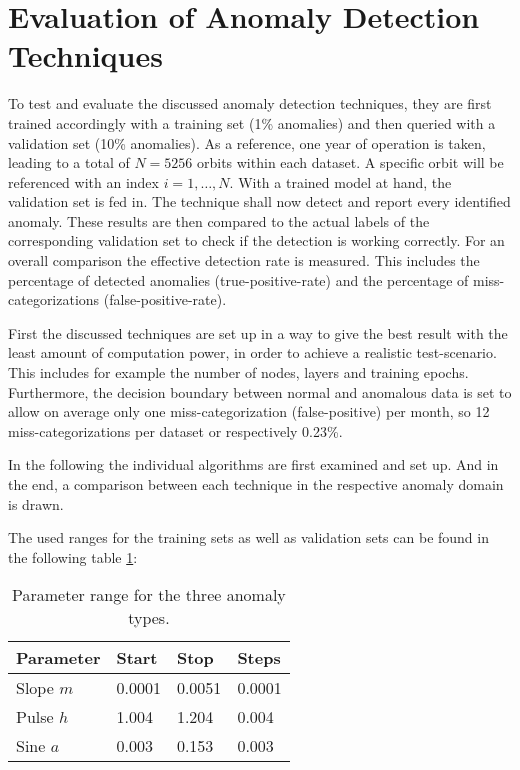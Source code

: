 \section{Evaluation of Anomaly Detection Techniques}
To test and evaluate the discussed anomaly detection techniques, they are first trained accordingly with a training set (1\% anomalies) and then queried with a validation set (10\% anomalies). As a reference, one year of operation is taken, leading to a total of $N = 5256$ orbits within each dataset. A specific orbit will be referenced with an index $i = 1, \hdots, N$. With a trained model at hand, the validation set is fed in. The technique shall now detect and report every identified anomaly. These results are then compared to the actual labels of the corresponding validation set to check if the detection is working correctly. \newline
For an overall comparison the effective detection rate is measured. This includes the percentage of detected anomalies (true-positive-rate) and the percentage of miss-categorizations (false-positive-rate). 

First the discussed techniques are set up in a way to give the best result with the least amount of computation power, in order to achieve a realistic test-scenario. This includes for example the number of nodes, layers and training epochs. \newline
Furthermore, the decision boundary between normal and anomalous data is set to allow on average only one miss-categorization (false-positive) per month, so 12 miss-categorizations per dataset or respectively 0.23\%.

In the following the individual algorithms are first examined and set up. And in the end, a comparison between each technique in the respective anomaly domain is drawn.

	\bigbreak
	
	The used ranges for the training sets as well as validation sets can be found in the following table \ref{t:parameter-range}:
	
	\begin{table}[htb]
	\centering
	\begin{tabular}{llll}
	\toprule
	Parameter	& Start		& Stop		& Steps		\\ \midrule
	Slope $m$	& 0.0001	& 0.0051	& 0.0001	\\
	Pulse $h$	& 1.004		& 1.204		& 0.004		\\
	Sine $a$	& 0.003		& 0.153		& 0.003		\\ \bottomrule
	\end{tabular}
	\caption{Parameter range for the three anomaly types.}
	\label{t:parameter-range}
	\end{table}

